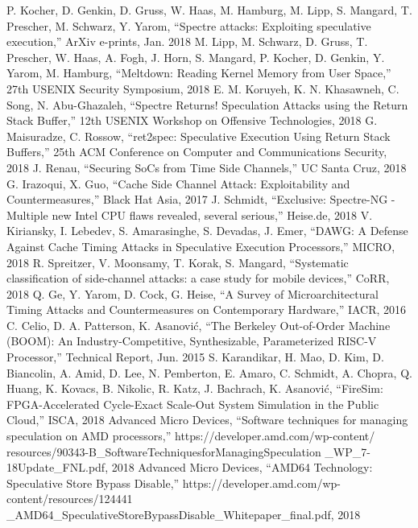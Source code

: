 \begin{thebibliography}{00}
     P. Kocher, D. Genkin, D. Gruss, W. Haas, M. Hamburg, M. Lipp, S. Mangard, T. Prescher, M. Schwarz, Y. Yarom, ``Spectre attacks: Exploiting speculative execution,'' ArXiv e-prints, Jan. 2018
     M. Lipp, M. Schwarz, D. Gruss, T. Prescher, W. Haas, A. Fogh, J. Horn, S. Mangard, P. Kocher, D. Genkin, Y. Yarom, M. Hamburg, ``Meltdown: Reading Kernel Memory from User Space,'' 27th USENIX Security Symposium, 2018
     E. M. Koruyeh, K. N. Khasawneh, C. Song, N. Abu-Ghazaleh, ``Spectre Returns! Speculation Attacks using the Return Stack Buffer,'' 12th USENIX Workshop on Offensive Technologies, 2018
     G. Maisuradze, C. Rossow, ``ret2spec: Speculative Execution Using Return Stack Buffers,'' 25th ACM Conference on Computer and Communications Security, 2018
     J. Renau, ``Securing SoCs from Time Side Channels,'' UC Santa Cruz, 2018
     G. Irazoqui, X. Guo, ``Cache Side Channel Attack: Exploitability and Countermeasures,'' Black Hat Asia, 2017
     J. Schmidt, ``Exclusive: Spectre-NG - Multiple new Intel CPU flaws revealed, several serious,'' Heise.de, 2018
     V. Kiriansky, I. Lebedev, S. Amarasinghe, S. Devadas, J. Emer, ``DAWG: A Defense Against Cache Timing Attacks in Speculative Execution Processors,'' MICRO, 2018
     R. Spreitzer, V. Moonsamy, T. Korak, S. Mangard, ``Systematic classification of side-channel attacks: a case study for mobile devices,'' CoRR, 2018
     Q. Ge, Y. Yarom, D. Cock, G. Heise, ``A Survey of Microarchitectural Timing Attacks and Countermeasures on Contemporary Hardware,'' IACR, 2016
     C. Celio, D. A. Patterson, K. Asanović, ``The Berkeley Out-of-Order Machine (BOOM): An Industry-Competitive, Synthesizable, Parameterized RISC-V Processor,'' Technical Report, Jun. 2015
     S. Karandikar, H. Mao, D. Kim, D. Biancolin, A. Amid, D. Lee, N. Pemberton, E. Amaro, C. Schmidt, A. Chopra, Q. Huang, K. Kovacs, B. Nikolic, R. Katz, J. Bachrach, K. Asanović, ``FireSim: FPGA-Accelerated Cycle-Exact Scale-Out System Simulation in the Public Cloud,'' ISCA, 2018
     Advanced Micro Devices, ``Software techniques for managing speculation on AMD processors,'' https://developer.amd.com/wp-content/ resources/90343-B\_SoftwareTechniquesforManagingSpeculation \_WP\_7-18Update\_FNL.pdf, 2018
     Advanced Micro Devices, ``AMD64 Technology: Speculative Store Bypass Disable,'' https://developer.amd.com/wp-content/resources/124441 \_AMD64\_SpeculativeStoreBypassDisable\_Whitepaper\_final.pdf, 2018

\end{thebibliography}
